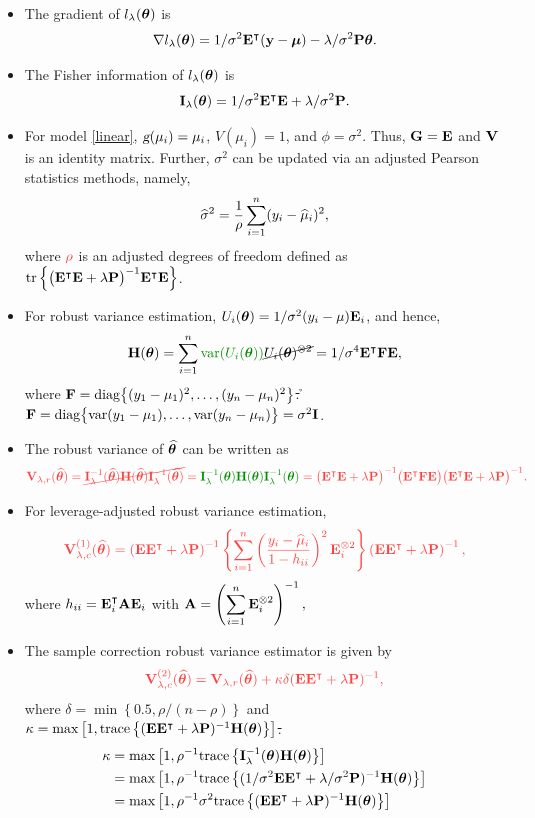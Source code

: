 \begin{itemize}
	\item The gradient of $l_\lambda(\bm\theta)$ is 
	$$
	\nabla l_\lambda(\bm\theta) = 1/\sigma^2\mathbf{E}^\intercal(\mathbf{y}-\bm\mu)-\lambda/\sigma^2\mathbf{P}\bm\theta.
	$$ 
	\item  The Fisher information of $l_\lambda(\bm\theta)$ is
	$$
	\mathbf{I}_\lambda(\bm\theta) = 1/\sigma^2\mathbf{E}^\intercal\mathbf{E}+\lambda/\sigma^2\mathbf{P}.
	$$
	\item For model \eqref{linear}, $\textsl{g}(\mu_i) = \mu_i$, $V(\mu_i) = 1$, and $\phi = \sigma^2$. Thus, $\mathbf{G} = \mathbf{E}$ and $\mathbf{V}$ is an identity matrix. Further, $\sigma^2$ can be updated via an adjusted Pearson statistics methods, namely,
	$$
	\widehat\sigma^2 = \frac{1}{\rho} \sum_{i=1}^n (y_i-\widehat\mu_i)^2,
	$$
	where $\x\rho$ is an adjusted degrees of freedom defined as $\text{tr}\left\{\big(\mathbf{E}^\intercal\mathbf{E}+\lambda\mathbf{P}\big)^{-1}\mathbf{E}^\intercal\mathbf{E}\right\}$. 
	\item For robust variance estimation, $U_i(\bm\theta) = 1/\sigma^2(y_i-\mu)\mathbf{E}_i$, and hence,
	$$
	\BH(\Bt) = \sum_{i=1}^n{\h \var(U_i(\Bt))}\cancel{U_i(\Bt)^{\otimes 2}} = 1/\sigma^4\BE^\p\BF\BE, 
	$$
	where \sout{$\mathbf{F}= \text{diag}\bigl\{(y_1-\mu_1)^2,\ldots,(y_n-\mu_n)^2\bigr\}$.} 
	{\h $\mathbf{F}=\text{diag}\bigl\{\text{var}(y_1-\mu_1),\ldots,\text{var}(y_n-\mu_n)\bigr\}=\sigma^2\mathbf{I}$.}
	\item The robust variance of $\widehat{\bm\theta}$ can be written as
	$$
	{\x \BV_{\lambda,r}(\wh\Bt) = \cancel{\BI_\lambda^{-1}(\wh\Bt)\BH(\wh\Bt)\BI_\lambda^{-1}(\wh\Bt)}
		= {\h\BI_\lambda^{-1}(\Bt)\BH(\Bt)\BI_\lambda^{-1}(\Bt)}
		= \bigl(\BE^\p\BE+\lambda\BP\bigr)^{-1}\bigl(\BE^\p\BF\BE\bigr)\bigl(\BE^\p\BE+\lambda\BP\bigr)^{-1}.}
	$$
	\item  For leverage-adjusted robust variance estimation, 
	$$
	\x\BV_{\lambda,c}^{(1)}(\wh\Bt) 
	= \left(\BE\BE^\p+\lambda\BP\right)^{-1}\left\{\sum_{i=1}^n\left(\frac{y_i-\wh\mu_i}{1-h_{ii}}\right)^2\BE_i^{\otimes 2}\right\}\left(\BE\BE^\p+\lambda\BP\right)^{-1},
	$$
	where
	$
	h_{ii} =\mathbf{E}_i^\intercal\mathbf{A}\mathbf{E}_i
	$
	with 
	$\mathbf{A}  = \left(\displaystyle\sum_{i=1}^n\mathbf{E}_i^{\otimes 2}\right)^{-1},
	$
	\item  The sample correction robust variance estimator is given by
	$$
	\x\BV_{\lambda,c}^{(2)}(\wh\Bt) = \BV_{\lambda,r}(\wh\Bt)+\kappa\delta(\BE\BE^\p+\lambda\BP)^{-1},
	$$
	where 
	$
	\delta = \min\left\{0.5,\rho/(n-\rho)\right\}
	$
	and
	\sout{$\kappa = \max\left[1,\text{trace}\left\{(\mathbf{E}\mathbf{E}^\intercal+\lambda\mathbf{P})^{-1}\mathbf{H}(\bm\theta)\right\}\right]$.}
	{\h
\begin{align*}
\kappa 
&= \max\left[1,\rho^{-1}\text{trace}\left\{\mathbf{I}_{\lambda}^{-1}(\bm\theta)\mathbf{H}(\bm\theta)\right\}\right] \\
&= \max\left[1,\rho^{-1}\text{trace}\left\{(1/\sigma^2\mathbf{E}\mathbf{E}^\intercal+\lambda/\sigma^2\mathbf{P})^{-1}\mathbf{H}(\bm\theta)\right\}\right] \\
&= \max\left[1,\rho^{-1}\sigma^2\text{trace}\left\{(\mathbf{E}\mathbf{E}^\intercal+\lambda\mathbf{P})^{-1}\mathbf{H}(\bm\theta)\right\}\right] 
\end{align*}
}
\end{itemize}

